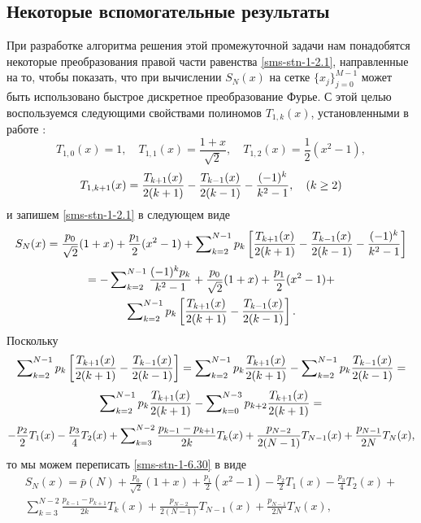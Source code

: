 \subsection{Некоторые вспомогательные результаты}

При разработке алгоритма решения этой промежуточной задачи нам понадобятся некоторые преобразования правой части равенства \eqref{sms-stn-1-2.1},
направленные на то, чтобы показать, что при вычислении $S_N(x)$ на сетке %
$\{x_j\}_{j=0}^{M-1}$ может быть использовано
быстрое дискретное преобразование Фурье. С этой целью воспользуемся следующими свойствами полиномов $T_{1,k}(x)$, установленными в работе \cite{RamShaIzv}:
\begin{equation}\label{sms-stn-1-sobcheb5}
T_{1,0}(x)=1, \quad T_{1,1}(x)=\frac{1+x}{\sqrt{2}}, \quad T_{1,2}(x)=\frac12(x^2-1),
\end{equation}
\begin{equation}\label{sms-stn-1-sobcheb6}
T_{1,k+1}(x)={T_{k+1}(x)\over2(k+1)}- {T_{k-1}(x)\over2(k-1)} -\frac{(-1)^k}{k^2-1},\quad (k\ge 2)
\end{equation}
и запишем  \eqref{sms-stn-1-2.1} в следующем виде
$$
S_N(x)=\frac{p_0}{\sqrt{2}}(1+x)+\frac{p_1}2(x^2-1)+ \sum\nolimits_{k=2}^{N-1}p_k\left[{T_{k+1}(x)\over2(k+1)}- {T_{k-1}(x)\over2(k-1)} -\frac{(-1)^k}{k^2-1}\right]
$$
\begin{multline}\label{sms-stn-1-6.30}
=-\sum\nolimits_{k=2}^{N-1} \frac{(-1)^kp_k}{k^2-1}+\frac{p_0}{\sqrt{2}}(1+x)+\frac{p_1}2(x^2-1)+
\\
\sum\nolimits_{k=2}^{N-1}p_k\left[{T_{k+1}(x)\over2(k+1)}- {T_{k-1}(x)\over2(k-1)}\right].
\end{multline}
Поскольку
$$
\sum\nolimits_{k=2}^{N-1}p_k\left[{T_{k+1}(x)\over2(k+1)}- {T_{k-1}(x)\over2(k-1)} \right]=
\sum\nolimits_{k=2}^{N-1}p_k{T_{k+1}(x)\over2(k+1)}-\sum\nolimits_{k=2}^{N-1}p_k{T_{k-1}(x)\over2(k-1)}=
$$
$$
\sum\nolimits_{k=2}^{N-1}p_k{T_{k+1}(x)\over2(k+1)}-\sum\nolimits_{k=0}^{N-3}p_{k+2}{T_{k+1}(x)\over2(k+1)}=
$$
$$
-{p_{2}\over2}T_{1}(x)-{p_{3}\over4}T_{2}(x)+\sum\nolimits_{k=3}^{N-2}{p_{k-1}-p_{k+1}\over2k}T_k(x)
+{p_{N-2}\over2(N-1)}T_{N-1}(x)+{p_{N-1}\over2N}T_{N}(x),
$$
то   мы можем переписать \eqref{sms-stn-1-6.30} в виде
\begin{multline}\label{sms-stn-1-6.31}
S_N(x)=
\bar p(N)+\frac{p_0}{\sqrt{2}}(1+x)+\frac{p_1}2(x^2-1)-\frac{p_{2}}{2}T_{1}(x)-\frac{p_{3}}{4}T_{2}(x)+
\\
\sum\nolimits_{k=3}^{N-2}\frac{p_{k-1}-p_{k+1}}{2k}T_k(x)
+\frac{p_{N-2}}{2(N-1)}T_{N-1}(x)+\frac{p_{N-1}}{2N}T_{N}(x),
\end{multline}
